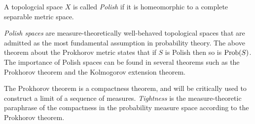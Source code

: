 \documentclass[10pt]{article}
\begin{document}
\begin{defn}
A topologcial space $X$ is called \emph{Polish} if it is homeomorphic to a complete separable metric space.
\end{defn}

\emph{Polish spaces} are measure-theoretically well-behaved topological spaces that are admitted as the most fundamental assumption in probability theory.
The above theorem about the Prokhorov metric states that if $S$ is Polish then so is $\operatorname{Prob}(S)$.
The importance of Polish spaces can be found in several theorems such as the Prokhorov theorem and the Kolmogorov extension theorem.

The Prokhorov theorem is a compactness theorem, and will be critically used to construct a limit of a sequence of measures.
\emph{Tightness} is the measure-theoretic paraphrase of the compactness in the probability measure space according to the Prokhorov theorem.
\end{document}
